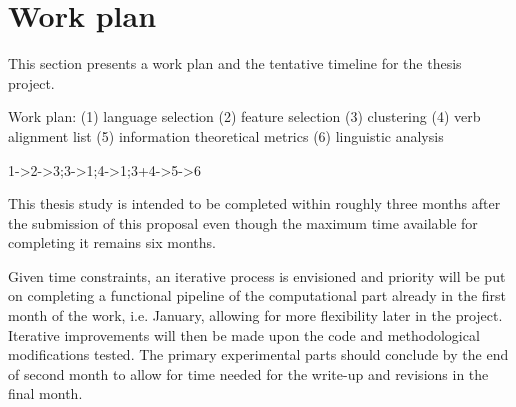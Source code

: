 \section{Work plan}\label{sec:plan}

This section presents a work plan and the tentative timeline for the thesis project.

Work plan:
(1) language selection
(2) feature selection
(3) clustering 
(4) verb alignment list
(5) information theoretical metrics
(6) linguistic analysis

1->2->3;3->1;4->1;3+4->5->6

This thesis study is intended to be completed within roughly three months after the submission of this proposal even though the maximum time available for completing it remains six months.

Given time constraints, an iterative process is envisioned and priority will be put on completing a functional pipeline of the computational part already in the first month of the work, i.e. January, allowing for more flexibility later in the project. Iterative improvements will then be made upon the code and methodological modifications tested. The primary experimental parts should conclude by the end of second month to allow for time needed for the write-up and revisions in the final month. 

